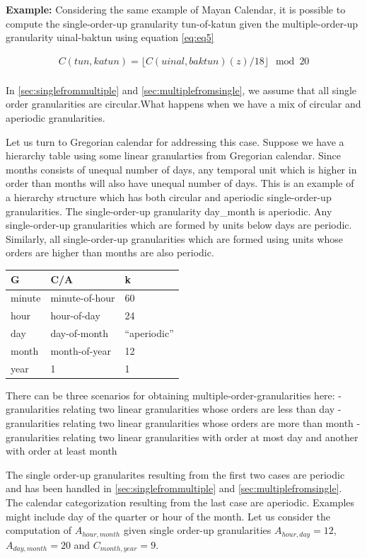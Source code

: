 \documentclass[12pt]{article}
\begin{document}
\textbf{Example:} Considering the same example of Mayan Calendar, it is
possible to compute the single-order-up granularity tun-of-katun given
the multiple-order-up granularity uinal-baktun using equation
\ref{eq:eq5}

\begin{equation} \label{eq10}
\begin{split}
C(tun, katun) =  \lfloor C(uinal, baktun)(z)/18\rfloor \mod 20 \\
\end{split}
\end{equation}

In \autoref{sec:singlefrommultiple} and
\autoref{sec:multiplefromsingle}, we assume that all single order
granularities are circular.What happens when we have a mix of circular
and aperiodic granularities.

Let us turn to Gregorian calendar for addressing this case. Suppose we
have a hierarchy table using some linear granularties from Gregorian
calendar. Since months consists of unequal number of days, any temporal
unit which is higher in order than months will also have unequal number
of days. This is an example of a hierarchy structure which has both
circular and aperiodic single-order-up granularities. The
single-order-up granularity day\_month is aperiodic. Any single-order-up
granularities which are formed by units below days are periodic.
Similarly, all single-order-up granularities which are formed using
units whose orders are higher than months are also periodic.

\begin{longtable}[]{@{}lll@{}}
\toprule
G & C/A & k\tabularnewline
\midrule
\endhead
minute & minute-of-hour & 60\tabularnewline
hour & hour-of-day & 24\tabularnewline
day & day-of-month & ``aperiodic''\tabularnewline
month & month-of-year & 12\tabularnewline
year & 1 & 1\tabularnewline
\bottomrule
\end{longtable}

There can be three scenarios for obtaining multiple-order-granularities
here: - granularities relating two linear granularities whose orders are
less than day - granularities relating two linear granularities whose
orders are more than month - granularities relating two linear
granularities with order at most day and another with order at least
month

The single order-up granularites resulting from the first two cases are
periodic and has been handled in \autoref{sec:singlefrommultiple} and
\autoref{sec:multiplefromsingle}. The calendar categorization resulting
from the last case are aperiodic. Examples might include day of the
quarter or hour of the month. Let us consider the computation of
\(A_{hour, month}\) given single order-up granularities
\(A_{hour, day} = 12\), \(A_{day, month} = 20\) and
\(C_{month, year} = 9\).
\end{document}
